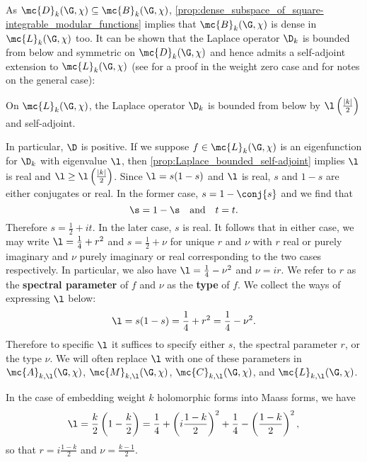     As $\mc{D}_{k}(\G,\chi) \subseteq \mc{B}_{k}(\G,\chi)$, \cref{prop:dense_subspace_of_square-integrable_modular_functions} implies that $\mc{B}_{k}(\G,\chi)$ is dense in $\mc{L}_{k}(\G,\chi)$ too. It can be shown that the Laplace operator $\D_{k}$ is bounded from below and symmetric on $\mc{D}_{k}(\G,\chi)$ and hence admits a self-adjoint extension to $\mc{L}_{k}(\G,\chi)$ (see \cite{iwaniec2002spectral} for a proof in the weight zero case and \cite{duke2002subconvexity} for notes on the general case):

    \begin{proposition}\label{prop:Laplace_bounded_self-adjoint}
      On $\mc{L}_{k}(\G,\chi)$, the Laplace operator $\D_{k}$ is bounded from below by $\l\left(\frac{|k|}{2}\right)$ and self-adjoint.
    \end{proposition}

    In particular, $\D$ is positive. If we suppose $f \in \mc{L}_{k}(\G,\chi)$ is an eigenfunction for $\D_{k}$ with eigenvalue $\l$, then \cref{prop:Laplace_bounded_self-adjoint} implies $\l$ is real and $\l \ge \l\left(\frac{|k|}{2}\right)$. Since $\l = s(1-s)$ and $\l$ is real, $s$ and $1-s$ are either conjugates or real. In the former case, $s = 1-\conj{s}$ and we find that
    \[
      \s = 1-\s \quad \text{and} \quad t = t.
    \]
    Therefore $s = \frac{1}{2}+it$. In the later case, $s$ is real. It follows that in either case, we may write $\l = \frac{1}{4}+r^{2}$ and $s = \frac{1}{2}+\nu$ for unique $r$ and $\nu$ with $r$ real or purely imaginary and $\nu$ purely imaginary or real corresponding to the two cases respectively. In particular, we also have $\l = \frac{1}{4}-\nu^{2}$ and $\nu = ir$. We refer to $r$ as the \textbf{spectral parameter} of $f$ and $\nu$ as the \textbf{type} of $f$. We collect the ways of expressing $\l$ below:
    \[
      \l = s(1-s) = \frac{1}{4}+r^{2} = \frac{1}{4}-\nu^{2}.
    \]
    Therefore to specific $\l$ it suffices to specify either $s$, the spectral parameter $r$, or the type $\nu$. We will often replace $\l$ with one of these parameters in $\mc{A}_{k,\l}(\G,\chi)$, $\mc{M}_{k,\l}(\G,\chi)$, $\mc{C}_{k,\l}(\G,\chi)$, and $\mc{L}_{k,\l}(\G,\chi)$. 
    
    \begin{remark}
      In the case of embedding weight $k$ holomorphic forms into Maass forms, we have
      \[
        \l = \frac{k}{2}\left(1-\frac{k}{2}\right) = \frac{1}{4}+\left(i\frac{1-k}{2}\right)^{2}+\frac{1}{4}-\left(\frac{1-k}{2}\right)^{2},
      \]
      so that $r = i\frac{1-k}{2}$ and $\nu = \frac{k-1}{2}$.
    \end{remark}
    
